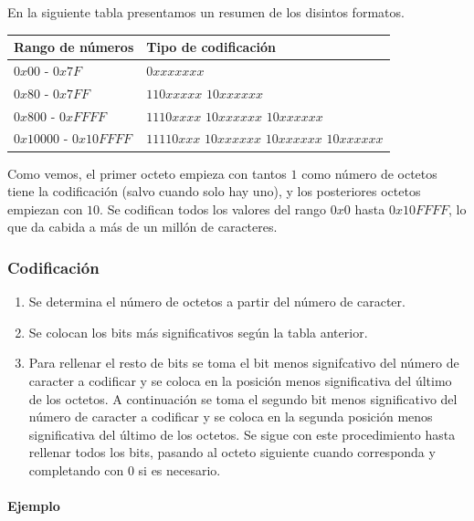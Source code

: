 \documentclass{article}
\begin{document}
En la siguiente tabla presentamos un resumen de los disintos formatos.

\begin{table}[h!]
  \centering
  \begin{tabular}{|l||l|}
    \hline
    Rango de números       & Tipo de codificación                        \\
    \hline \hline
    $0x00$ - $0x7F$        & $0xxxxxxx$                                  \\
    \hline
    $0x80$ - $0x7FF$       & $110xxxxx$ $10xxxxxx$                       \\
    \hline
    $0x800$ - $0xFFFF$     & $1110xxxx$ $10xxxxxx$ $10xxxxxx$            \\
    \hline
    $0x10000$ - $0x10FFFF$ & $11110xxx$ $10xxxxxx$ $10xxxxxx$ $10xxxxxx$ \\
    \hline
  \end{tabular}
\end{table}

Como vemos, el primer octeto empieza con tantos $1$ como número de octetos tiene
la codificación (salvo cuando solo hay uno), y los posteriores octetos empiezan
con $10$. Se codifican todos los valores del rango $0x0$ hasta $0x10FFFF$, lo
que da cabida a más de un millón de caracteres.

\subsubsection{Codificación}

\begin{enumerate}
  \item Se determina el número de octetos a partir del número de caracter.
  \item Se colocan los bits más significativos según la tabla anterior.
  \item Para rellenar el resto de bits se toma el bit menos signifcativo del
        número de caracter a codificar y se coloca en la posición menos significativa
        del último de los octetos. A continuación se toma el segundo bit menos
        significativo del número de caracter a codificar y se coloca en la segunda
        posición menos significativa del último de los octetos. Se sigue con este
        procedimiento hasta rellenar todos los bits, pasando al octeto siguiente
        cuando corresponda y completando con $0$ si es necesario.
\end{enumerate}

\paragraph*{Ejemplo}
\end{document}

